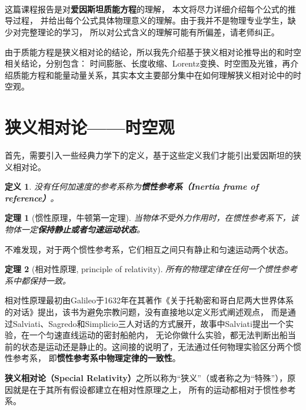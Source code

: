 \documentclass[12pt, a4paper, oneside]{ctexart}
\newtheorem{theorem}{定理}[section] %
\newtheorem{definition}{定义}[section]
\numberwithin{equation}{section}  %
\newenvironment{myTitle}[1]{
    \begin{center}
    {\makebox[0.8\linewidth][s]{\zihao{2}\bf #1}\\}
    \vspace{1ex}
    \zihao{4}\it
}{\end{center}}  %
\begin{document}
\clearpage
\begin{myTitle}{西安交通大学学生答题纸}
\\[1ex]
\\[1ex]
\end{myTitle}

这篇课程报告是对\textbf{爱因斯坦质能方程}的理解，
本文将尽力详细介绍每个公式的推导过程，
并给出每个公式具体物理意义的理解。由于我并不是物理专业学生，缺少对完整理论的学习，
所以对公式含义的理解可能有所偏差，请老师纠正。

由于质能方程是狭义相对论的结论，所以我先介绍基于狭义相对论推导出的和时空相关结论，分别包含：
时间膨胀、长度收缩、Lorentz变换、时空图及光锥，再介绍质能方程和能量动量关系，其实本文主要部分集中在如何理解狭义相对论中的时空观。
\section{狭义相对论——时空观}
首先，需要引入一些经典力学下的定义，基于这些定义我们才能引出爱因斯坦的狭义相对论。
\begin{definition}
没有任何加速度的参考系称为\textbf{惯性参考系（Inertia frame of reference）}。
\end{definition}
\begin{theorem}[惯性原理，牛顿第一定理]
    当物体不受外力作用时，在惯性参考系下，该物体一定\textbf{保持静止或者匀速运动状态}。
\end{theorem}
不难发现，对于两个惯性参考系，它们相互之间只有静止和匀速运动两个状态。
\begin{theorem}[相对性原理, principle of relativity]
    所有的物理定律在任何一个惯性参考系中都保持一致。
\end{theorem}
相对性原理最初由Galileo于1632年在其著作《关于托勒密和哥白尼两大世界体系的对话》提出，该书为避免宗教问题，没有直接地以定义形式阐述观点，
而是通过Salviati、Sagredo和Simplicio三人对话的方式展开，故事中Salviati提出一个实验，在一个匀速直线运动的密封船舱内，
无论你做什么实验，都无法判断出船当前的状态是运动还是静止的。这间接的说明了，无法通过任何物理实验区分两个惯性参考系，
即\textbf{惯性参考系中物理定律的一致性}。

\textbf{狭义相对论（Special Relativity）}之所以称为“狭义”（或者称之为“特殊”），原因就是在于其所有假设都建立在相对性原理之上，
所有的运动都相对于惯性参考系。
\end{document}
